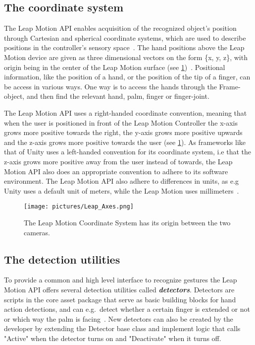 \subsection{The coordinate system}
The Leap Motion API enables acquisition of the recognized object's position through Cartesian and spherical coordinate systems, 
which are used to describe positions in the controller's sensory space~\citep{Guna2014}. The hand positions above the Leap Motion device are given as three dimensional
vectors on the form \{x, y, z\}, with origin being in the center of the Leap Motion surface (see \ref{fig:leapmotion3})~\citep{LeapMotion2016}.  
Positional information, like the position of a hand, or the position of the tip of a finger, can be access in various ways. One way is to access the hands through the
Frame-object, and then find the relevant hand, palm, finger or finger-joint.

The Leap Motion API uses a right-handed coordinate convention, meaning that when the user is positioned in front of the Leap Motion Controller the x-axis grows more positive 
towards the right, the y-axis grows more positive upwards and the z-axis grows more positive towards the user (see \ref{fig:leapmotion3}). 
As frameworks like that of Unity uses a left-handed convention for its coordinate system, i.e that the z-axis grows more positive away from the 
user instead of towards, the Leap Motion API also does an appropriate convention to adhere to its software environment. 
The Leap Motion API also adhere to differences in units, as e.g Unity uses a default unit of meters, while the Leap Motion uses millimeters~\citep{LeapMotion2016}.

\begin{figure}%
	\texttt{[image: pictures/Leap\_Axes.png]}
	\caption[Leap Motion Coordinates]{The Leap Motion Coordinate System has its origin between the two cameras.}
	\label{fig:leapmotion3}
\end{figure} 

\subsection{The detection utilities}
To provide a common and high level interface to recognize gestures the Leap Motion API offers several detection utilities called \textbf{\textit{detectors}}.
Detectors are scripts in the core asset package that serve as basic building blocks for hand action detections, and can e.g.~detect whether a certain finger is extended or not
or which way the palm is facing~\citep{LeapMotion2016}. New detectors can also be created by the developer by extending
the Detector base class and implement logic that calls "Active" when the detector turns on and "Deactivate" when it turns off.

